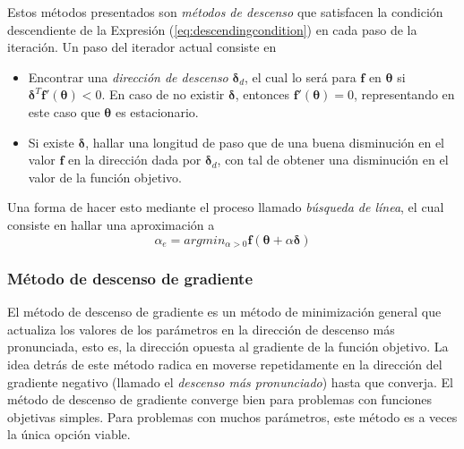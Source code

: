 Estos métodos presentados son \textit{métodos de descenso} que satisfacen la condición descendiente de la Expresión (\ref{eq:descendingcondition}) en cada paso de la iteración. Un paso del iterador actual consiste en
\begin{itemize}
    \item Encontrar una \textit{dirección de descenso} $\bm{\delta}_d$, el cual lo será para $\bm{f}$ en $\bm{\theta}$ si $\bm{\delta}^T\bm{f}'(\bm{\theta}) < 0$. En caso de no existir $\bm{\delta}$, entonces $\bm{f}'(\bm{\theta}) = 0$, representando en este caso que $\bm{\theta}$ es estacionario.
    \item Si existe $\bm{\delta}$, hallar una longitud de paso que de una buena disminución en el valor $\bm{f}$ en la dirección dada por $\bm{\delta}_d$, con tal de obtener una disminución en el valor de la función objetivo.
\end{itemize}

Una forma de hacer esto mediante el proceso llamado \textit{búsqueda de línea}, el cual consiste en hallar una aproximación a
\begin{equation}
    \alpha_e = argmin_{\alpha > 0} \bm{f}(\bm{\theta}+\alpha \bm{\delta})
\end{equation}

\subsubsection{Método de descenso de gradiente}

El método de descenso de gradiente es un método de minimización general que actualiza los valores de los parámetros en la dirección de descenso más pronunciada, esto es, la dirección opuesta al gradiente de la función objetivo. La idea detrás de este método radica en moverse repetidamente en la dirección del gradiente negativo (llamado el \textit{descenso más pronunciado}) hasta que converja. El método de descenso de gradiente converge bien para problemas con funciones objetivas simples. Para problemas con muchos parámetros, este método es a veces la única opción viable.

